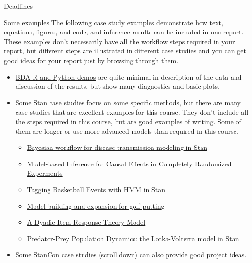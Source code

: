 \documentclass[
  13pt,
  ignorenonframetext,
]{beamer}
\providecommand{\tightlist}{%
  \setlength{\itemsep}{0pt}\setlength{\parskip}{0pt}}
\begin{document}
\begin{frame}[fragile]{Deadlines}
\begin{block}{Some examples}
\protect\hypertarget{some-examples}{}
The following case study examples demonstrate how text, equations,
figures, and code, and inference results can be included in one report.
These examples don't necessarily have all the workflow steps required in
your report, but different steps are illustrated in different case
studies and you can get good ideas for your report just by browsing
through them.

\begin{itemize}
\tightlist
\item
  \href{demos.html}{BDA R and Python demos} are quite minimal in
  description of the data and discussion of the results, but show many
  diagnostics and basic plots.
\item
  Some \href{https://mc-stan.org/users/documentation/case-studies}{Stan
  case studies} focus on some specific methods, but there are many case
  studies that are excellent examples for this course. They don't
  include all the steps required in this course, but are good examples
  of writing. Some of them are longer or use more advanced models than
  required in this course.

  \begin{itemize}
  \tightlist
  \item
    \href{https://mc-stan.org/users/documentation/case-studies/boarding_school_case_study.html}{Bayesian
    workflow for disease transmission modeling in Stan}
  \item
    \href{https://mc-stan.org/users/documentation/case-studies/model-based_causal_inference_for_RCT.html}{Model-based
    Inference for Causal Effects in Completely Randomized Experments}
  \item
    \href{https://mc-stan.org/users/documentation/case-studies/bball-hmm.html}{Tagging
    Basketball Events with HMM in Stan}
  \item
    \href{https://mc-stan.org/users/documentation/case-studies/golf.html}{Model
    building and expansion for golf putting}
  \item
    \href{https://mc-stan.org/users/documentation/case-studies/dyadic_irt_model.html}{A
    Dyadic Item Response Theory Model}
  \item
    \href{https://mc-stan.org/users/documentation/case-studies/lotka-volterra-predator-prey.html}{Predator-Prey
    Population Dynamics: the Lotka-Volterra model in Stan}
  \end{itemize}
\item
  Some \href{https://github.com/stan-dev/stancon_talks}{StanCon case
  studies} (scroll down) can also provide good project ideas.
\end{itemize}
\end{block}
\end{frame}
\end{document}
